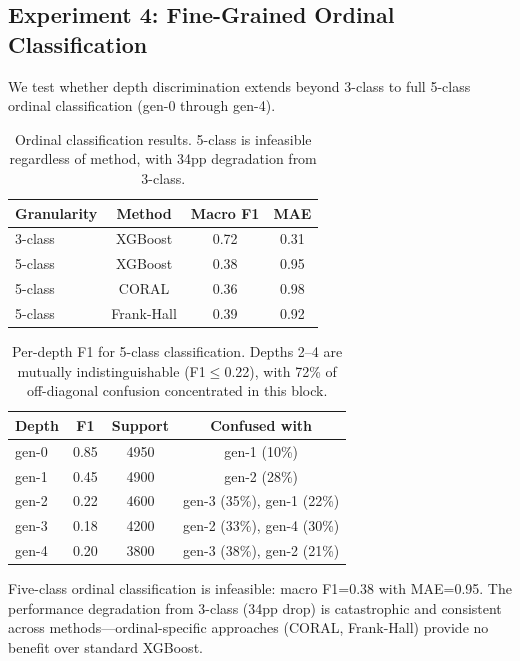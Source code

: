 \documentclass[11pt,a4paper]{article}
\begin{document}
\subsection{Experiment 4: Fine-Grained Ordinal Classification}
\label{sec:exp4}

We test whether depth discrimination extends beyond 3-class to full 5-class ordinal classification (gen-0 through gen-4).

\begin{table}[h]
\centering
\small
\begin{tabular}{lccc}
\toprule
\textbf{Granularity} & \textbf{Method} & \textbf{Macro F1} & \textbf{MAE} \\
\midrule
3-class & XGBoost & 0.72 & 0.31 \\
5-class & XGBoost & 0.38 & 0.95 \\
5-class & CORAL & 0.36 & 0.98 \\
5-class & Frank-Hall & 0.39 & 0.92 \\
\bottomrule
\end{tabular}
\caption{Ordinal classification results. 5-class is infeasible regardless of method, with 34pp degradation from 3-class.}
\label{tab:ordinal}
\end{table}

\begin{table}[h]
\centering
\small
\begin{tabular}{lccc}
\toprule
\textbf{Depth} & \textbf{F1} & \textbf{Support} & \textbf{Confused with} \\
\midrule
gen-0 & 0.85 & 4950 & gen-1 (10\%) \\
gen-1 & 0.45 & 4900 & gen-2 (28\%) \\
gen-2 & 0.22 & 4600 & gen-3 (35\%), gen-1 (22\%) \\
gen-3 & 0.18 & 4200 & gen-2 (33\%), gen-4 (30\%) \\
gen-4 & 0.20 & 3800 & gen-3 (38\%), gen-2 (21\%) \\
\bottomrule
\end{tabular}
\caption{Per-depth F1 for 5-class classification. Depths 2--4 are mutually indistinguishable (F1$\leq$0.22), with 72\% of off-diagonal confusion concentrated in this block.}
\label{tab:per_depth}
\end{table}

Five-class ordinal classification is infeasible: macro F1=0.38 with MAE=0.95. The performance degradation from 3-class (34pp drop) is catastrophic and consistent across methods---ordinal-specific approaches (CORAL, Frank-Hall) provide no benefit over standard XGBoost.
\end{document}
